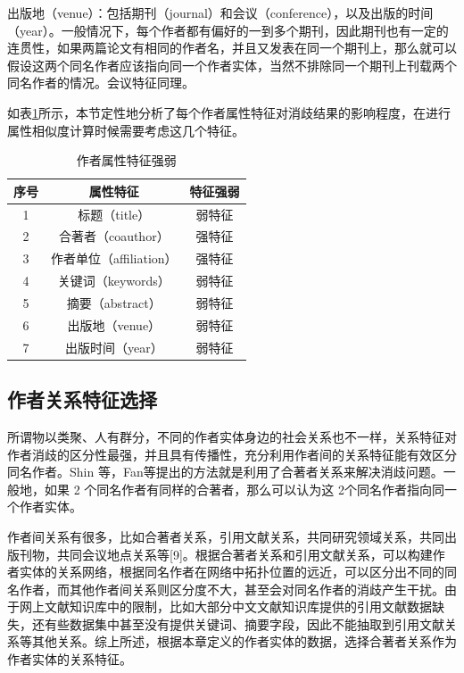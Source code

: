 \documentclass[sigchi]{acmart}
\begin{document}
出版地（venue）：包括期刊（journal）和会议（conference），以及出版的时间（year）。一般情况下，每个作者都有偏好的一到多个期刊，因此期刊也有一定的连贯性，如果两篇论文有相同的作者名，并且又发表在同一个期刊上，那么就可以假设这两个同名作者应该指向同一个作者实体，当然不排除同一个期刊上刊载两个同名作者的情况。会议特征同理。

如表\ref{tab:attr}所示，本节定性地分析了每个作者属性特征对消歧结果的影响程度，在进行属性相似度计算时候需要考虑这几个特征。
\begin{table}[h]
    \caption{作者属性特征强弱}
    \label{tab:attr}
    \begin{tabular}{ccc}
      \toprule
      序号 & 属性特征              & 特征强弱 \\
    \midrule
    1  & 标题（title）         & 弱特征  \\
    2  & 合著者（coauthor）     & 强特征  \\
    3  & 作者单位（affiliation） & 强特征  \\
    4  & 关键词（keywords）     & 弱特征  \\
    5  & 摘要（abstract）      & 弱特征  \\
    6  & 出版地（venue）        & 弱特征  \\
    7  & 出版时间（year）        & 弱特征 \\
    \bottomrule
  \end{tabular}
  \end{table}

\subsection{作者关系特征选择}
所谓物以类聚、人有群分，不同的作者实体身边的社会关系也不一样，关系特征对作者消歧的区分性最强，并且具有传播性，充分利用作者间的关系特征能有效区分同名作者。Shin 等\cite{ShinKim-467}，Fan等\cite{FanWang-466}提出的方法就是利用了合著者关系来解决消歧问题。一般地，如果 2 个同名作者有同样的合著者，那么可以认为这 2个同名作者指向同一个作者实体\cite{ShinKim-468}。

作者间关系有很多，比如合著者关系，引用文献关系，共同研究领域关系，共同出版刊物，共同会议地点关系等[9]。根据合著者关系和引用文献关系，可以构建作者实体的关系网络，根据同名作者在网络中拓扑位置的远近，可以区分出不同的同名作者，而其他作者间关系则区分度不大，甚至会对同名作者的消歧产生干扰。由于网上文献知识库中的限制，比如大部分中文文献知识库提供的引用文献数据缺失，还有些数据集中甚至没有提供关键词、摘要字段，因此不能抽取到引用文献关系等其他关系。综上所述，根据本章定义的作者实体的数据，选择合著者关系作为作者实体的关系特征。
\end{document}
